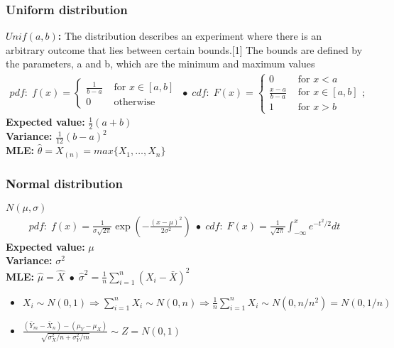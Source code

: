 \documentclass{article}
\begin{document}
\subsubsection{Uniform distribution}
\textbf{$Unif(a, b)$:} The distribution describes an experiment where there is an arbitrary outcome that lies between certain bounds.[1] The bounds are defined by the parameters, a and b, which are the minimum and maximum values
\begin{align*}
    pdf: \; f(x) = \begin{cases}
        \frac{1}{b-a} & \textrm{ for } x \in [a,b]\\
        0 & \textrm{ otherwise}
    \end{cases} \;\bullet\;
    cdf: \; F(x) = \begin{cases}
        0 & \textrm{ for } x < a\\
        \frac{x-a}{b-a} & \textrm{ for } x \in [a,b]\\
        1 & \textrm{ for } x > b
    \end{cases}; 
\end{align*}
\textbf{Expected value:} $\frac{1}{2}(a + b)$\\
\textbf{Variance:} $\frac{1}{12}(b - a)^2$\\
\textbf{MLE:} $\hat{\theta} = X_{(n)} = max\{X_1, \dots, X_n\}$

\subsubsection{Normal distribution}
\textbf{$N(\mu, \sigma)$}
\begin{align*}
    pdf: \; f(x) = \frac{1}{\sigma \sqrt{2 \pi}} \exp \left (-\frac{(x - \mu)^2}{2 \sigma ^ 2}\right ) \;\bullet\;
    cdf: \; F(x) = \frac{1}{\sqrt{2 \pi}} \int_{- \infty}^x e^{-t^2 / 2} dt
\end{align*}
\textbf{Expected value:} $\mu$\\
\textbf{Variance:} $\sigma^2$\\
\textbf{MLE:} $\hat{\mu} = \hat{X} \; \bullet \; \hat{\sigma}^2 = \frac{1}{n}\sum_{i=1}^n(X_i - \bar{X})^2$
\begin{itemize}
    \item $X_i \sim N(0,1) \Longrightarrow \sum_{i=1}^nX_i \sim N(0,n) \Longrightarrow \frac{1}{n}\sum_{i=1}^nX_i \sim N(0,n/n^2) = N(0, 1/n)$
    \item $\frac{(\bar{Y}_m - \bar{X}_n) - (\mu_Y - \mu_X)}{\sqrt{\sigma_X^2/n + \sigma_Y^2/m}} \sim Z = N(0,1)$
\end{itemize}
\end{document}

